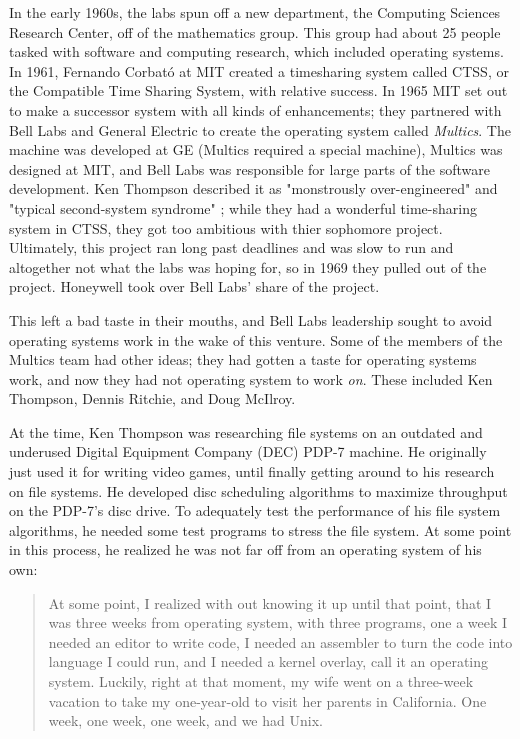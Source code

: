 In the early 1960s, the labs spun off a new department, the Computing Sciences Research Center,
off of the mathematics group. This group had about 25 people tasked with software and computing
research, which included operating systems.
In 1961, Fernando Corbat\'{o} at MIT created a timesharing system called CTSS,
or the Compatible Time Sharing System, with relative success.
In 1965 MIT set out to make a successor system with all kinds of enhancements; they partnered with
Bell Labs and General Electric to create the operating system called \textit{Multics}.
The machine was developed at GE (Multics required a special machine), Multics was designed at MIT,
and Bell Labs was responsible for large parts of the software development.
Ken Thompson described it as "monstrously over-engineered" and "typical second-system syndrome"
\cite{kernighan_interviews_thompson_2019};
while they had a wonderful time-sharing system in CTSS, they got too ambitious with thier sophomore project.
Ultimately, this project ran long past deadlines and was slow to run and altogether not what
the labs was hoping for, so in 1969 they pulled out of the project.
Honeywell took over Bell Labs' share of the project.

This left a bad taste in their mouths, and Bell Labs leadership sought to avoid operating
systems work in the wake of this venture.
Some of the members of the Multics team had other ideas; they had gotten a taste for
operating systems work, and now they had not operating system to work \textit{on}.
These included Ken Thompson, Dennis Ritchie, and Doug McIlroy.

At the time, Ken Thompson was researching file systems on an outdated and underused
Digital Equipment Company (DEC) PDP-7 machine.
He originally just used it for writing video games, until finally getting around to
his research on file systems.
He developed disc scheduling algorithms to maximize throughput on the PDP-7's disc drive.
To adequately test the performance of his file system algorithms, he needed some test
programs to stress the file system.
At some point in this process, he realized he was not far off from an
operating system of his own\cite{kernighan_interviews_thompson_2019}:

\begin{quotation}
At some point, I realized with out knowing it up until that point, that I was 
three weeks from operating system, with three programs, one a week I needed an 
editor to write code, I needed an assembler to turn the code into language I 
could run, and I needed a kernel overlay, call it an operating system.  
Luckily, right at that moment, my wife went on a three-week vacation to take my 
one-year-old to visit her parents in California. One week, one week, one week, 
and we had Unix.
\end{quotation}

